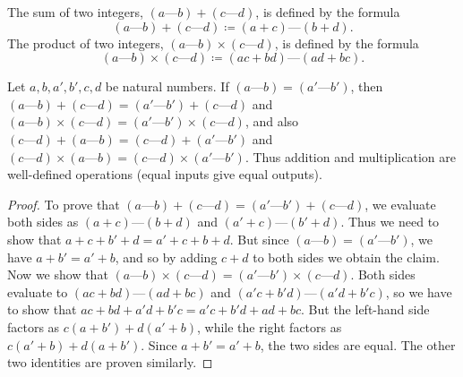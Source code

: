 \begin{definition}\label{4.1.2}
    The sum of two integers, \((a \text{---} b) + (c \text{---} d)\), is defined by the formula
    \[
        (a \text{---} b) + (c \text{---} d) \coloneqq (a + c) \text{---} (b + d).
    \]
    The product of two integers, \((a \text{---} b) \times (c \text{---} d)\), is defined by the formula
    \[
        (a \text{---} b) \times (c \text{---} d) \coloneqq (ac + bd) \text{---} (ad + bc).
    \]
\end{definition}

\begin{lemma}\label{4.1.3}
    Let \(a, b, a', b', c, d\) be natural numbers.
    If \((a \text{---} b) = (a' \text{---} b')\), then \((a \text{---} b) + (c \text{---} d) = (a' \text{---} b') + (c \text{---} d)\) and \((a \text{---} b) \times (c \text{---} d) = (a' \text{---} b') \times (c \text{---} d)\), and also \((c \text{---} d) + (a \text{---} b) = (c \text{---} d) + (a' \text{---} b')\) and \((c \text{---} d) \times (a \text{---} b) = (c \text{---} d) \times (a' \text{---} b')\).
    Thus addition and multiplication are well-defined operations (equal inputs give equal outputs).
\end{lemma}

\begin{proof}
    To prove that \((a \text{---} b) + (c \text{---} d) = (a' \text{---} b') + (c \text{---} d)\), we evaluate both sides as \((a + c) \text{---} (b + d)\) and \((a' + c) \text{---} (b' + d)\).
    Thus we need to show that \(a + c + b' + d = a' + c + b + d\).
    But since \((a \text{---} b) = (a' \text{---} b')\), we have \(a + b' = a' + b\), and so by adding \(c + d\) to both sides we obtain the claim.
    Now we show that \((a \text{---} b) \times (c \text{---} d) = (a' \text{---} b') \times (c \text{---} d)\).
    Both sides evaluate to \((ac + bd) \text{---} (ad + bc)\) and \((a'c + b'd) \text{---} (a'd + b'c)\), so we have to show that \(ac + bd + a'd + b'c = a'c + b'd + ad + bc\).
    But the left-hand side factors as \(c(a + b') + d(a' + b)\), while the right factors as \(c(a' + b) + d(a + b')\).
    Since \(a + b' = a' + b\), the two sides are equal.
    The other two identities are proven similarly.
\end{proof}

